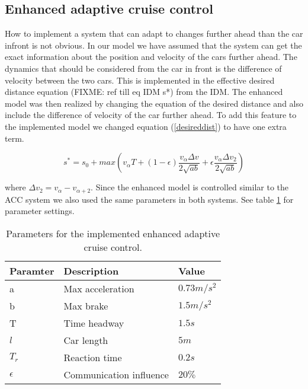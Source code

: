 \subsection {Enhanced adaptive cruise control}
How to implement a system that can adapt to changes further ahead than the car infront is not obvious. In our model we have assumed that the system can get the exact information about the position and velocity of the cars further ahead.
The dynamics that should be considered from the car in front is the difference of velocity between the two cars. This is implemented in the effective desired distance equation (FIXME: ref till eq IDM s*) from the IDM. The enhanced model was then realized by changing the equation of the desired distance and also include the difference of velocity of the car further ahead. To add this feature to the implemented model we changed equation (\ref{desireddist}) to have one extra term.

\begin{equation}s^\ast = s_0 + max(v_\alpha T + (1-\epsilon )\frac{v_\alpha \Delta v}{2\sqrt{ab}} + \epsilon \frac{v_\alpha \Delta v_2}{2\sqrt{ab}})\end{equation}

where $ \Delta v_2 = v_\alpha - v_{\alpha +2} $.
Since the enhanced model is controlled similar to the ACC system we also used the same parameters in both systems. See table \ref{acc_config} for parameter settings.

\begin{center}
\begin{table}[H]
\begin{tabular}{| l | l | l |} \hline
Paramter & Description & Value\\ \hline
a & Max acceleration & $ 0.73 \unit{m/s^2} $\\ \hline
b & Max brake & $ 1.5 \unit{m/s^2} $\\ \hline
T & Time headway & $ 1.5 \unit{s} $ \\ \hline
$ l $ & Car length & $ 5 \unit{m} $ \\ \hline
$ T_r $ & Reaction time & $ 0.2 \unit{s} $ \\ \hline
$ \epsilon $ & Communication influence & $ 20 \% $ \\ \hline
\end{tabular}
\caption{\label{acc_config} Parameters for the implemented enhanced adaptive cruise control.}
\end{table}
\end{center}


